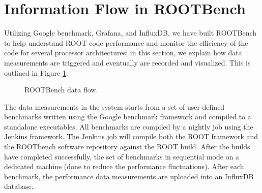 \documentclass{webofc}
\begin{document}
\section{Information Flow in ROOTBench} \label{sec:info-flow}
Utilizing Google benchmark, Grafana, and InfluxDB, we have built ROOTBench \cite{rootbench} to help understand ROOT code performance and monitor the efficiency of the code for several processor architectures; in this section, we explain how data measurements are triggered and eventually are recorded and visualized.  This is outlined in Figure \ref{fig:InformationFlow}.


\begin{figure}[!h]
  \centering
  \caption{ROOTBench data flow.}
  \label{fig:InformationFlow}
\end{figure}

The data measurements in the system starts from a set of user-defined benchmarks written using the Google benchmark framework and compiled to a standalone executables. All benchmarks are compiled by a nightly job using the Jenkins framework. The Jenkins job will compile both the ROOT framework and the ROOTbench software repository against the ROOT build. After the builds have completed successfully, the set of benchmarks in sequential mode on a dedicated machine (done to reduce the performance fluctuations). After each benchmark, the performance data measurements are uploaded into an InfluxDB database.
\end{document}
